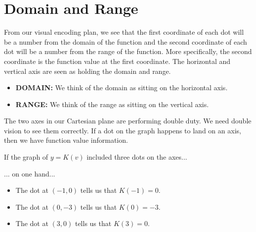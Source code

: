 \documentclass{ximera}
\begin{document}
\section*{Domain and Range}


From our visual encoding plan, we see that the first coordinate of each dot will be a number from the domain of the function and the second coordinate of each dot will be a number from the range of the function.  More specifically, the second coordinate is the function value at the first coordinate.  The horizontal and vertical axis are seen as holding the domain and range.

\begin{itemize}
\item \textbf{DOMAIN:} We think of the domain as sitting on the horizontal axis.
\item \textbf{RANGE:} We think of the range as sitting on the vertical axis.
\end{itemize}


The two axes in our Cartesian plane are performing double duty.  We need double vision to see them correctly. If a dot on the graph happens to land on an axis, then we have function value information.

If the graph of $y=K(v)$ included three dots on the axes...

\begin{image}
\end{image}


... on one hand...
\begin{itemize}
\item The dot at $(-1,0)$ tells us that $K(-1) = 0$.
\item The dot at $(0,-3)$ tells us that $K(0) = -3$.
\item The dot at $(3,0)$ tells us that $K(3) = 0$.
\end{itemize}
\end{document}
